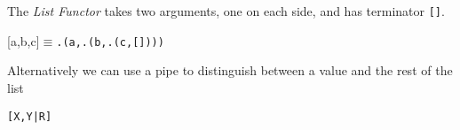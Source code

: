 \documentclass[11pt,a4paper]{article}
\begin{document}
The \textit{List Functor} takes two arguments, one on each side, and has terminator \lstinline![]!.
\begin{center}
[a,b,c]$\equiv$\lstinline!.(a,.(b,.(c,[])))!
\end{center}
Alternatively we can use a pipe to distinguish between a value and the rest of the list
\begin{center}
\lstinline![X,Y|R]!
\end{center}
\end{document}
